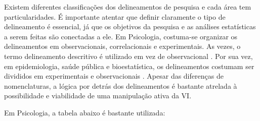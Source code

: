 \documentclass[
]{book}
\begin{document}
Existem diferentes classificações dos delineamentos de pesquisa e cada área tem particularidades. É importante atentar que definir claramente o tipo de delineamento é essencial, já que os objetivos da pesquisa e as análises estatísticas a serem feitas são conectadas a ele. Em Psicologia, costuma-se organizar os delineamentos em observacionais, correlacionais e experimentais. As vezes, o termo delineamento descritivo é utilizado em vez de observacional \citep{stangor2010}. Por sua vez, em epidemiologia, saúde pública e bioestatística, os delineamentos costumam ser divididos em experimentais e observacionais \citep{friis2013, glantz2014}. Apesar das diferenças de nomenclaturas, a lógica por detrás dos delineamentos é bastante atrelada à possibilidade e viabilidade de uma manipulação ativa da VI.

Em Psicologia, a tabela abaixo é bastante utilizada:
\end{document}
